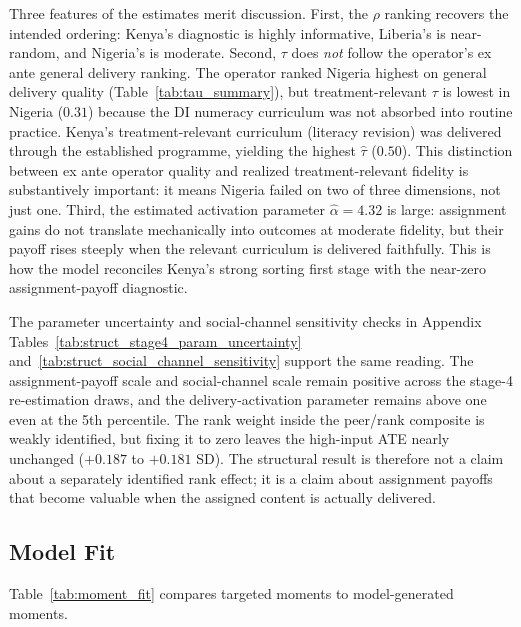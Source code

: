 \documentclass[11pt]{article}
\begin{document}
Three features of the estimates merit discussion. First, the $\rho$ ranking recovers the intended ordering: Kenya's diagnostic is highly informative, Liberia's is near-random, and Nigeria's is moderate. Second, $\tau$ does \emph{not} follow the operator's ex ante general delivery ranking. The operator ranked Nigeria highest on general delivery quality (Table~\ref{tab:tau_summary}), but treatment-relevant $\tau$ is lowest in Nigeria ($0.31$) because the DI numeracy curriculum was not absorbed into routine practice. Kenya's treatment-relevant curriculum (literacy revision) was delivered through the established programme, yielding the highest $\hat{\tau}$ ($0.50$). This distinction between ex ante operator quality and realized treatment-relevant fidelity is substantively important: it means Nigeria failed on two of three dimensions, not just one. Third, the estimated activation parameter $\hat{\alpha}=4.32$ is large: assignment gains do not translate mechanically into outcomes at moderate fidelity, but their payoff rises steeply when the relevant curriculum is delivered faithfully. This is how the model reconciles Kenya's strong sorting first stage with the near-zero assignment-payoff diagnostic.

The parameter uncertainty and social-channel sensitivity checks in Appendix Tables~\ref{tab:struct_stage4_param_uncertainty} and~\ref{tab:struct_social_channel_sensitivity} support the same reading. The assignment-payoff scale and social-channel scale remain positive across the stage-4 re-estimation draws, and the delivery-activation parameter remains above one even at the 5th percentile. The rank weight inside the peer/rank composite is weakly identified, but fixing it to zero leaves the high-input ATE nearly unchanged ($+0.187$ to $+0.181$ SD). The structural result is therefore not a claim about a separately identified rank effect; it is a claim about assignment payoffs that become valuable when the assigned content is actually delivered.

\subsection{Model Fit}
\label{subsec:struct_fit}

Table~\ref{tab:moment_fit} compares targeted moments to model-generated moments.


\end{document}
